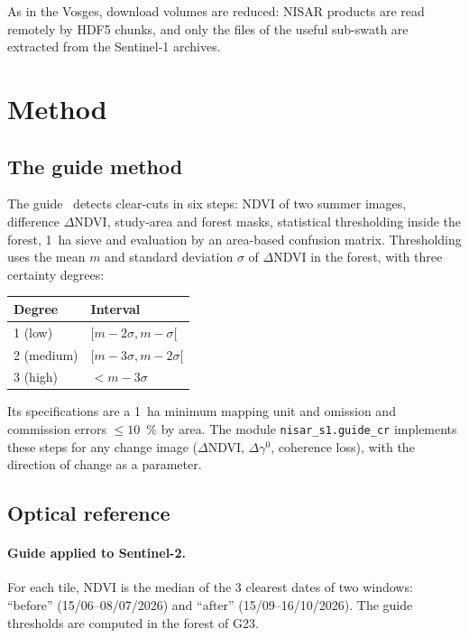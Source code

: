 As in the Vosges, download volumes are reduced: NISAR products are read remotely by HDF5 chunks, and only the files
of the useful sub-swath are extracted from the Sentinel-1 archives.

\section{Method}

\subsection{The guide method}

The guide~\cite{ose2015guide} detects clear-cuts in six steps: NDVI of two summer images, difference
$\Delta$NDVI, study-area and forest masks, statistical thresholding inside the forest, 1~ha sieve and evaluation by
an area-based confusion matrix. Thresholding uses the mean $m$ and standard deviation $\sigma$ of $\Delta$NDVI in the
forest, with three certainty degrees:
\begin{center}\small
\begin{tabular}{ll}
\toprule
Degree & Interval \\
\midrule
1 (low) & $[m-2\sigma, m-\sigma[$ \\
2 (medium) & $[m-3\sigma, m-2\sigma[$ \\
3 (high) & $< m-3\sigma$ \\
\bottomrule
\end{tabular}
\end{center}
Its specifications are a 1~ha minimum mapping unit and omission and commission errors $\leq 10$~\% by area. The
module \texttt{nisar\_s1.guide\_cr} implements these steps for any change image ($\Delta$NDVI, $\Delta\gamma^0$,
coherence loss), with the direction of change as a parameter.

\subsection{Optical reference}

\paragraph{Guide applied to Sentinel-2.} For each tile, NDVI is the median of the 3 clearest dates of two windows:
\enquote{before} (15/06--08/07/2026) and \enquote{after} (15/09--16/10/2026). The guide thresholds are computed in
the forest of G23.

